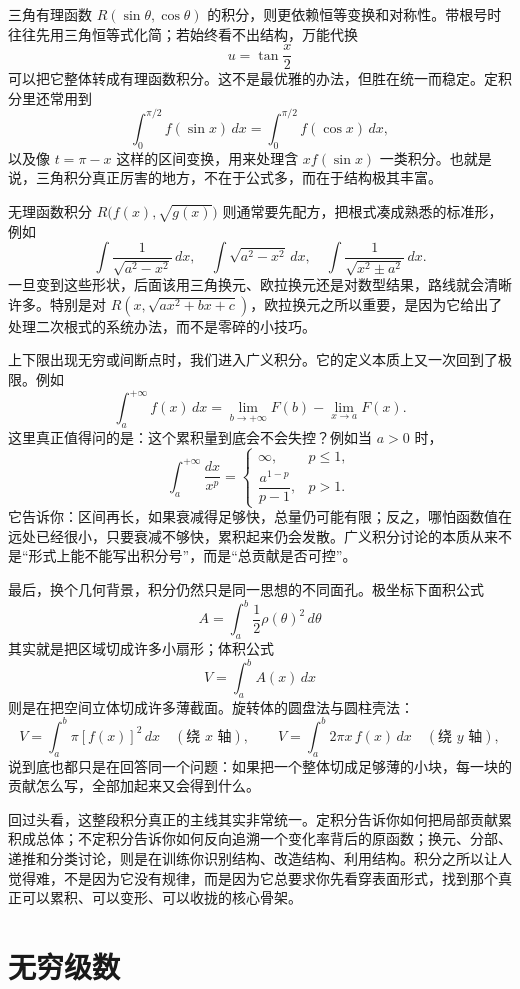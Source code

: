\documentclass[UTF8]{ctexbook}
\begin{document}
三角有理函数 $R(\sin\theta,\cos\theta)$ 的积分，则更依赖恒等变换和对称性。带根号时往往先用三角恒等式化简；若始终看不出结构，万能代换
\[
u=\tan\frac{x}{2}
\]
可以把它整体转成有理函数积分。这不是最优雅的办法，但胜在统一而稳定。定积分里还常用到
\[
\int_0^{\pi/2} f(\sin x)\,dx=\int_0^{\pi/2} f(\cos x)\,dx,
\]
以及像 $t=\pi-x$ 这样的区间变换，用来处理含 $x f(\sin x)$ 一类积分。也就是说，三角积分真正厉害的地方，不在于公式多，而在于结构极其丰富。

无理函数积分 $R\bigl(f(x),\sqrt{g(x)}\bigr)$ 则通常要先配方，把根式凑成熟悉的标准形，例如
\[
\int \frac{1}{\sqrt{a^2-x^2}}\,dx,\quad
\int \sqrt{a^2-x^2}\,dx,\quad
\int \frac{1}{\sqrt{x^2\pm a^2}}\,dx.
\]
一旦变到这些形状，后面该用三角换元、欧拉换元还是对数型结果，路线就会清晰许多。特别是对 $R(x,\sqrt{ax^2+bx+c})$，欧拉换元之所以重要，是因为它给出了处理二次根式的系统办法，而不是零碎的小技巧。

上下限出现无穷或间断点时，我们进入广义积分。它的定义本质上又一次回到了极限。例如
\[
\int_a^{+\infty} f(x)\,dx=\lim_{b\to +\infty}F(b)-\lim_{x\to a}F(x).
\]
这里真正值得问的是：这个累积量到底会不会失控？例如当 $a>0$ 时，
\[
\int_a^{+\infty}\frac{dx}{x^p}=
\begin{cases}
\infty,& p\le 1,\\
\dfrac{a^{1-p}}{p-1},& p>1.
\end{cases}
\]
它告诉你：区间再长，如果衰减得足够快，总量仍可能有限；反之，哪怕函数值在远处已经很小，只要衰减不够快，累积起来仍会发散。广义积分讨论的本质从来不是“形式上能不能写出积分号”，而是“总贡献是否可控”。

最后，换个几何背景，积分仍然只是同一思想的不同面孔。极坐标下面积公式
\[
A=\int_a^b \frac12\rho(\theta)^2\,d\theta
\]
其实就是把区域切成许多小扇形；体积公式
\[
V=\int_a^b A(x)\,dx
\]
则是在把空间立体切成许多薄截面。旋转体的圆盘法与圆柱壳法：
\[
V=\int_a^b \pi[f(x)]^2\,dx\quad(\text{绕 }x\text{ 轴}),\qquad
V=\int_a^b 2\pi x\,f(x)\,dx\quad(\text{绕 }y\text{ 轴}),
\]
说到底也都只是在回答同一个问题：如果把一个整体切成足够薄的小块，每一块的贡献怎么写，全部加起来又会得到什么。

回过头看，这整段积分真正的主线其实非常统一。定积分告诉你如何把局部贡献累积成总体；不定积分告诉你如何反向追溯一个变化率背后的原函数；换元、分部、递推和分类讨论，则是在训练你识别结构、改造结构、利用结构。积分之所以让人觉得难，不是因为它没有规律，而是因为它总要求你先看穿表面形式，找到那个真正可以累积、可以变形、可以收拢的核心骨架。


\newpage
\section{无穷级数}
\end{document}
